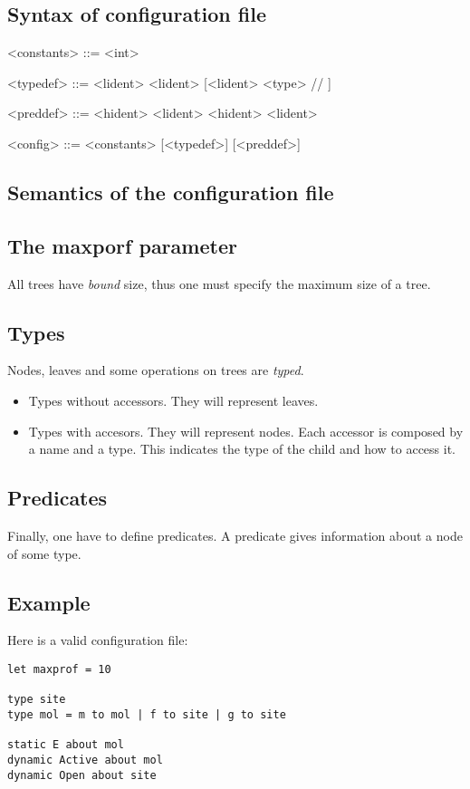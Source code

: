 \documentclass[10pt,a4paper]{article}
\begin{document}
\subsection{Syntax of configuration file}
\begin{grammar}
  <constants> ::=
    \lit{=} <int>

  <typedef> ::=
   <lident>
  \alt {} <lident> \lit{=} [<lident>  <type> // \lit{|} ]

  <preddef> ::=
   <hident>  <lident>
  \alt {} <hident>  <lident>

  <config> ::=
  <constants> [<typedef>] [<preddef>]
\end{grammar}

\subsection{Semantics of the configuration file}
\subsection{The maxporf parameter}
All trees have \emph{bound} size, thus one must specify the maximum size of a tree.

\subsection{Types}
Nodes, leaves and some operations on trees are \emph{typed}.
\begin{itemize}
\item Types without accessors. They will represent leaves.
\item Types with accesors. They will represent nodes. Each accessor is composed by a name and a type.
  This indicates the type of the child and how to access it.
\end{itemize}

\subsection{Predicates}
Finally, one have to define predicates. A predicate gives information about a node of some type.

\subsection{Example}
Here is a valid configuration file:
\begin{verbatim}
let maxprof = 10

type site
type mol = m to mol | f to site | g to site

static E about mol
dynamic Active about mol
dynamic Open about site
\end{verbatim}
\end{document}
